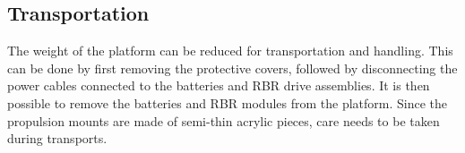 \subsection{Transportation}

The weight of the platform can be reduced for transportation and handling. This can be done by first removing the protective covers, followed by disconnecting the power cables connected to the batteries and RBR drive assemblies. It is then possible to remove the batteries and RBR modules from the platform. Since the propulsion mounts are made of semi-thin acrylic pieces, care needs to be taken during transports. %
